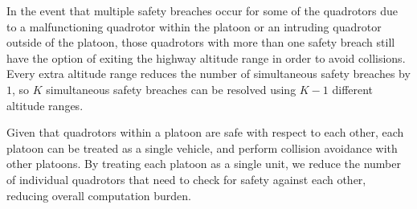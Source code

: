 In the event that multiple safety breaches occur for some of the quadrotors due to a malfunctioning quadrotor within the platoon or an intruding quadrotor outside of the platoon, those quadrotors with more than one safety breach still have the option of exiting the highway altitude range in order to avoid collisions. Every extra altitude range reduces the number of simultaneous safety breaches by $1$, so $K$ simultaneous safety breaches can be resolved using $K-1$ different altitude ranges. 

Given that quadrotors within a platoon are safe with respect to each other, each platoon can be treated as a single vehicle, and perform collision avoidance with other platoons. By treating each platoon as a single unit, we reduce the number of individual quadrotors that need to check for safety against each other, reducing overall computation burden.